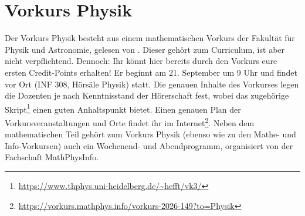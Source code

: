 \section{Vorkurs Physik}
Der Vorkurs Physik besteht aus einem mathematischen Vorkurs der Fakultät für Physik und Astronomie, gelesen von \dozentvorkurs. Dieser gehört zum Curriculum, ist aber nicht verpflichtend. Dennoch: Ihr könnt hier bereits durch den Vorkurs eure ersten Credit-Points erhalten! Er beginnt am 21. September um 9 Uhr und findet vor Ort (INF 308, Hörsäle Physik) statt. Die genauen Inhalte des Vorkurses legen die Dozenten je nach Kenntnisstand der Hörerschaft fest, wobei das zugehörige Skript\footnote{\url{https://www.thphys.uni-heidelberg.de/~hefft/vk3/}} einen guten Anhaltspunkt bietet. Einen genauen Plan der Vorkursveranstaltungen und Orte findet ihr im Internet\footnote{\label{physik-vorkursplan}\url{https://vorkurs.mathphys.info/vorkurs-2026-149?to=Physik}}. Neben dem mathematischen Teil gehört zum Vorkurs Physik (ebenso wie zu den Mathe- und Info-Vorkursen) auch ein Wochenend- und Abendprogramm, organisiert von der Fachschaft MathPhysInfo.


